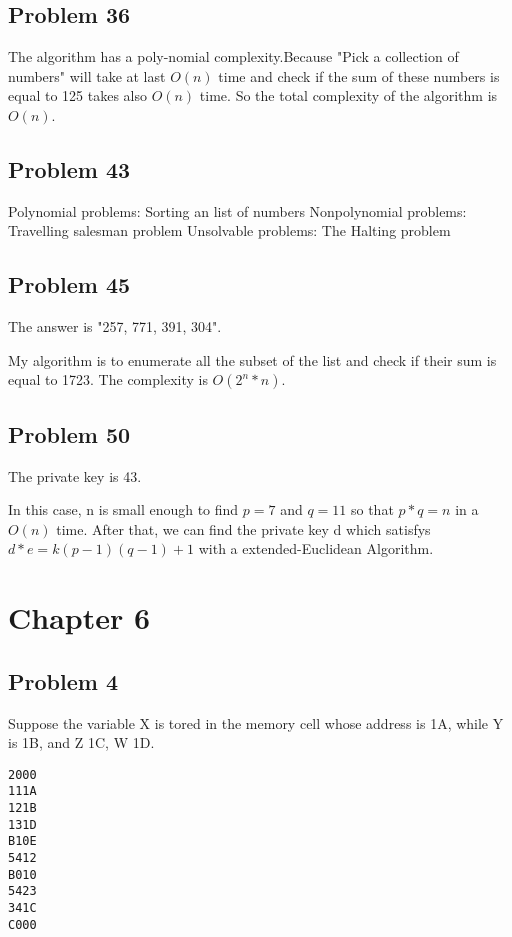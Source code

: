 \documentclass[11pt]{article}
\begin{document}
\subsection{Problem 36}

The algorithm has a poly-nomial complexity.Because "Pick a collection of numbers" will take at last $O(n)$ time and check if the sum of these numbers is equal to 125 takes also $O(n)$ time. So the total complexity of the algorithm is $O(n)$.

\subsection{Problem 43}

Polynomial problems: Sorting an list of numbers
Nonpolynomial problems: Travelling salesman problem
Unsolvable problems: The Halting problem

\subsection{Problem 45}

The answer is "257, 771, 391, 304".

My algorithm is to enumerate all the subset of the list and check if their sum is equal to 1723. The complexity is $O(2^n *n )$.

\subsection{Problem 50}

The private key is 43.

In this case, n is small enough to find $p=7$ and $q=11$ so that $p*q = n$ in a $O(n)$ time. After that, we can find the private key d which satisfys $d*e = k(p-1)(q-1) +1$ with a extended-Euclidean Algorithm. 

\section{Chapter 6}

\subsection{Problem 4}

Suppose the variable X is tored in the memory cell whose address is 1A, while Y is 1B, and Z 1C, W 1D.

\begin{lstlisting}
2000
111A
121B
131D
B10E
5412
B010
5423
341C
C000
\end{lstlisting}
\end{document}
